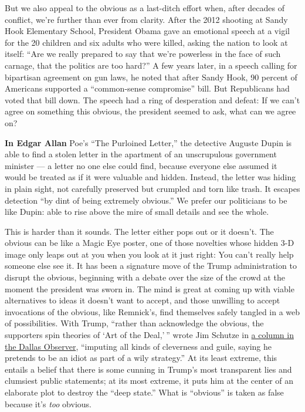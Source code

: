 But we also appeal to the obvious as a last-ditch effort when, after
decades of conflict, we're further than ever from clarity. After the
2012 shooting at Sandy Hook Elementary School, President Obama gave an
emotional speech at a vigil for the 20 children and six adults who were
killed, asking the nation to look at itself: ``Are we really prepared to
say that we're powerless in the face of such carnage, that the politics
are too hard?'' A few years later, in a speech calling for bipartisan
agreement on gun laws, he noted that after Sandy Hook, 90 percent of
Americans supported a ``common-sense compromise'' bill. But Republicans
had voted that bill down. The speech had a ring of desperation and
defeat: If we can't agree on something this obvious, the president
seemed to ask, what can we agree on?

\textbf{In Edgar Allan} Poe's ``The Purloined Letter,'' the detective
Auguste Dupin is able to find a stolen letter in the apartment of an
unscrupulous government minister --- a letter no one else could find,
because everyone else assumed it would be treated as if it were valuable
and hidden. Instead, the letter was hiding in plain sight, not carefully
preserved but crumpled and torn like trash. It escapes detection ``by
dint of being extremely obvious.'' We prefer our politicians to be like
Dupin: able to rise above the mire of small details and see the whole.

This is harder than it sounds. The letter either pops out or it doesn't.
The obvious can be like a Magic Eye poster, one of those novelties whose
hidden 3-D image only leaps out at you when you look at it just right:
You can't really help someone else see it. It has been a signature move
of the Trump administration to disrupt the obvious, beginning with a
debate over the size of the crowd at the moment the president was sworn
in. The mind is great at coming up with viable alternatives to ideas it
doesn't want to accept, and those unwilling to accept invocations of the
obvious, like Remnick's, find themselves safely tangled in a web of
possibilities. With Trump, ``rather than acknowledge the obvious, the
supporters spin theories of `Art of the Deal,' '' wrote Jim Schutze in
\href{https://www.dallasobserver.com/news/a-more-obvious-trump-theory-the-man-is-just-an-idiot-10918056}{a
column in the Dallas Observer}, ``imputing all kinds of cleverness and
guile, saying he pretends to be an idiot as part of a wily strategy.''
At its least extreme, this entails a belief that there is some cunning
in Trump's most transparent lies and clumsiest public statements; at its
most extreme, it puts him at the center of an elaborate plot to destroy
the ``deep state.'' What is ``obvious'' is taken as false because it's
\emph{too} obvious.

